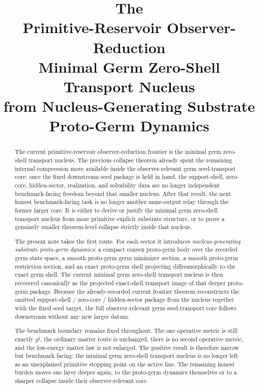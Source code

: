\documentclass[11pt]{article}
\title{\textbf{The \TheoryName{}}\\[0.4em]
\large Primitive-Reservoir Observer-Reduction\\
\large Minimal Germ Zero-Shell Transport Nucleus\\
\large from Nucleus-Generating Substrate Proto-Germ Dynamics}
\author{}
\date{}
\newcommand{\CompletedMetric}{g^{\sharp}}
\begin{document}
\maketitle

\begin{abstract}
The current primitive-reservoir observer-reduction frontier is the minimal germ zero-shell transport nucleus. The previous collapse theorem already spent the remaining internal compression move available inside the observer-relevant germ seed-transport core: once the fixed downstream seed package is held in hand, the support-shell, zero-core, hidden-sector, realization, and solvability data are no longer independent benchmark-facing freedom beyond that smaller nucleus. After that result, the next honest benchmark-facing task is no longer another same-output relay through the former larger core. It is either to derive or justify the minimal germ zero-shell transport nucleus from more primitive explicit substrate structure, or to prove a genuinely smaller theorem-level collapse strictly inside that nucleus.

The present note takes the first route. For each sector it introduces \emph{nucleus-generating substrate proto-germ dynamics}: a compact convex proto-germ body over the recorded germ state space, a smooth proto-germ germ minimizer section, a smooth proto-germ restriction section, and an exact proto-germ shell projecting diffeomorphically to the exact germ shell. The current minimal germ zero-shell transport nucleus is then recovered canonically as the projected exact-shell transport image of that deeper proto-germ package. Because the already-recorded current frontier theorem reconstructs the omitted support-shell / zero-core / hidden-sector package from the nucleus together with the fixed seed target, the full observer-relevant germ seed-transport core follows downstream without any new larger datum.

The benchmark boundary remains fixed throughout. The one operative metric is still exactly \(\CompletedMetric\), the ordinary matter route is unchanged, there is no second operative metric, and the low-energy matter law is not enlarged. The positive result is therefore narrow but benchmark facing: the minimal germ zero-shell transport nucleus is no longer left as an unexplained primitive stopping point on the active line. The remaining honest burden moves one layer deeper again, to the proto-germ dynamics themselves or to a sharper collapse inside their observer-relevant core.
\end{abstract}
\end{document}

